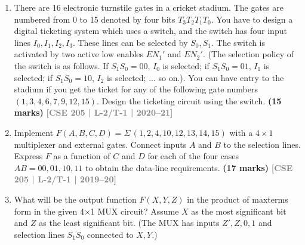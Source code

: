 \documentclass[12pt,a4paper]{article}
\newcommand{\yr}[1]{\hfill\textcolor{gray}{\small\textbf{[#1]}}}
\newcommand{\mk}[1]{\textcolor{orange!70!black}{\small\textbf{(#1 marks)}}}
\begin{document}
\begin{enumerate}
\item There are 16 electronic turnstile gates in a cricket stadium. The gates are numbered from 0 to 15 denoted by four bits $T_3T_2T_1T_0$. You have to design a digital ticketing system which uses a switch, and the switch has four input lines $I_0, I_1, I_2, I_3$. These lines can be selected by $S_0, S_1$. The switch is activated by two active low enables $EN_1'$ and $EN_2'$. (The selection policy of the switch is as follows. If $S_1S_0 = 00$, $I_0$ is selected; if $S_1S_0 = 01$, $I_1$ is selected; if $S_1S_0 = 10$, $I_2$ is selected; ... so on.). You can have entry to the stadium if you get the ticket for any of the following gate numbers $(1, 3, 4, 6, 7, 9, 12, 15)$. Design the ticketing circuit using the switch.
\mk{15} \yr{CSE 205 | L-2/T-1 | 2020--21}

\item Implement $F(A,B,C,D) = \Sigma\,(1,2,4,10,12,13,14,15)$ with a $4\times1$ multiplexer and external gates. Connect inputs $A$ and $B$ to the selection lines. Express $F$ as a function of $C$ and $D$ for each of the four cases $AB=00,01,10,11$ to obtain the data-line requirements.
\mk{17} \yr{CSE 205 | L-2/T-1 | 2019--20}

\item What will be the output function $F(X, Y, Z)$ in the product of maxterms form in the given 4$\times$1 MUX circuit? Assume $X$ as the most significant bit and $Z$ as the least significant bit. (The MUX has inputs $Z', Z, 0, 1$ and selection lines $S_1S_0$ connected to $X, Y$.)

\begin{center}
\end{center}
\end{enumerate}
\end{document}
